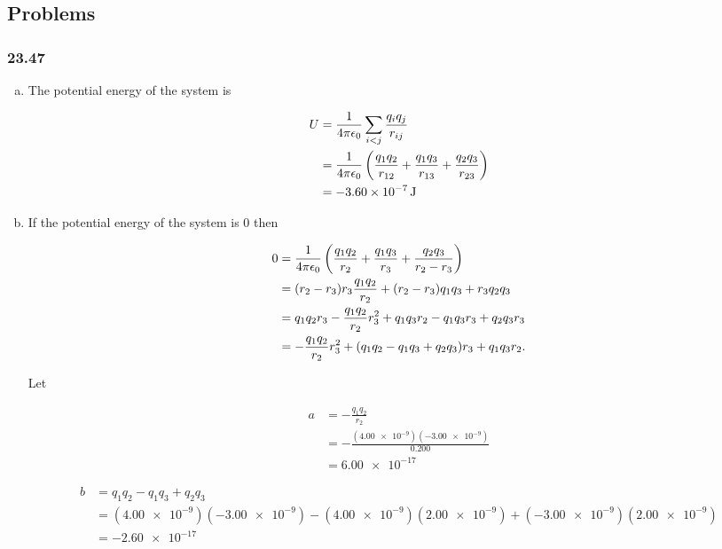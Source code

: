 \documentclass{article}
\begin{document}
\subsection{Problems}

\subsubsection{23.47}

\begin{enumerate}[a)]
  \item The potential energy of the system is

        \begin{align*}
          U & = \frac{1}{4 \pi \epsilon_0} \sum_{i < j} \frac{q_i q_j}{r_{ij}}                                                     \\
            & = \frac{1}{4 \pi \epsilon_0} \left( \frac{q_1 q_2}{r_{12}} + \frac{q_1 q_3}{r_{13}} + \frac{q_2 q_3}{r_{23}} \right) \\
            & = \qty{-3.60e-7}{J}
        \end{align*}

  \item If the potential energy of the system is $0$ then

        \begin{align*}
          0 & = \frac{1}{4 \pi \epsilon_0} \left( \frac{q_1 q_2}{r_2} + \frac{q_1 q_3}{r_3} + \frac{q_2 q_3}{r_2 - r_3} \right) \\
            & = (r_2 - r_3) r_3 \frac{q_1 q_2}{r_2} + (r_2 - r_3) q_1 q_3 + r_3 q_2 q_3                  \\
            & = q_1 q_2 r_3 - \frac{q_1 q_2}{r_2} r_3^2 + q_1 q_3 r_2 - q_1 q_3 r_3 + q_2 q_3 r_3        \\
            & = -\frac{q_1 q_2}{r_2} r_3^2 + (q_1 q_2 - q_1 q_3 + q_2 q_3) r_3 + q_1 q_3 r_2.
        \end{align*}

        Let

        \begin{align*}
          a & = -\frac{q_1 q_2}{r_2}                            \\
            & = -\frac{(\num{4.00e-9}) (\num{-3.00e-9})}{0.200} \\
            & = \num{6.00e-17}
        \end{align*}

        \begin{align*}
          b & = q_1 q_2 - q_1 q_3 + q_2 q_3                                                                          \\
            & = (\num{4.00e-9}) (\num{-3.00e-9}) - (\num{4.00e-9})(\num{2.00e-9}) + (\num{-3.00e-9}) (\num{2.00e-9}) \\
            & = \num{-2.60e-17}
        \end{align*}


\end{enumerate}
\end{document}
